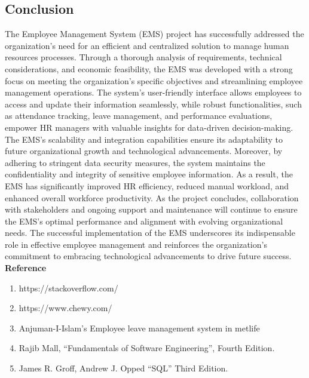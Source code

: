 \subsection{Conclusion}
The Employee Management System (EMS) project has successfully addressed the organization's
need for an efficient and centralized solution to manage human resources processes. Through a
thorough analysis of requirements, technical considerations, and economic feasibility, the EMS
was developed with a strong focus on meeting the organization's specific objectives and
streamlining employee management operations. The system's user-friendly interface allows
employees to access and update their information seamlessly, while robust functionalities, such
as attendance tracking, leave management, and performance evaluations, empower HR
managers with valuable insights for data-driven decision-making. The EMS's scalability and
integration capabilities ensure its adaptability to future organizational growth and technological
advancements. Moreover, by adhering to stringent data security measures, the system
maintains the confidentiality and integrity of sensitive employee information. As a result, the
EMS has significantly improved HR efficiency, reduced manual workload, and enhanced overall
workforce productivity. As the project concludes, collaboration with stakeholders and ongoing
support and maintenance will continue to ensure the EMS's optimal performance and
alignment with evolving organizational needs. The successful implementation of the EMS
underscores its indispensable role in effective employee management and reinforces the
organization's commitment to embracing technological advancements to drive future success.
\vspace{5.5mm}
\textbf{Reference}

 \begin{enumerate}
     \item https://stackoverflow.com/
     \item https://www.chewy.com/
     \item Anjuman-I-Islam’s Employee leave management system in metlife
     \item Rajib Mall, “Fundamentals of Software Engineering”, Fourth Edition.
     \item James R. Groff, Andrew J. Opped “SQL” Third Edition.
 \end{enumerate}